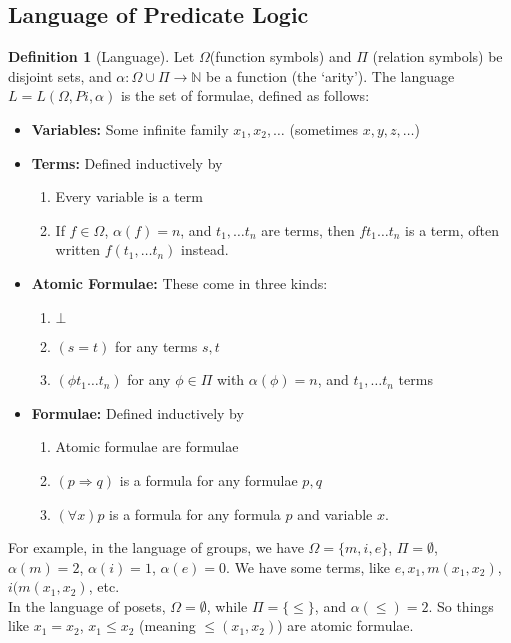 \documentclass{article}
\theoremstyle{definition}
\newtheorem{definition}{Definition}
\numberwithin{definition}{section}
\begin{document}
\subsection{Language of Predicate Logic}
\begin{definition}[Language]
Let $\Omega$(function symbols) and $\Pi$ (relation symbols) be disjoint sets, and $\alpha: \Omega \cup \Pi \to \mathbb{N}$ be a function (the `arity'). The language $L = L(\Omega,Pi,\alpha)$ is the set of formulae, defined as follows: 
\begin{itemize}
\item \textbf{Variables:} Some infinite family $x_{1},x_{2},\ldots$ (sometimes $x,y,z,\ldots$)
\item \textbf{Terms:} Defined inductively by
	\begin{enumerate}[i]
	\item Every variable is a term
	\item If $f \in \Omega$, $\alpha(f) = n$, and $t_{1},\ldots t_{n}$ are terms, then $ft_{1}\ldots t_{n}$ is a term, often written $f(t_{1},\ldots t_{n})$ instead. 
	\end{enumerate}
\item \textbf{Atomic Formulae:} These come in three kinds:
	\begin{enumerate}[i]
	\item $\bot$
	\item $(s=t)$ for any terms $s,t$ 
	\item $(\phi t_{1}\ldots t_{n})$ for any $\phi \in \Pi$ with $\alpha(\phi)=n$, and $t_{1},\ldots t_{n}$ terms
	\end{enumerate}
\item \textbf{Formulae:} Defined inductively by
	\begin{enumerate}[i]
	\item Atomic formulae are formulae
	\item $(p \Rightarrow q)$ is a formula for any formulae $p,q$
	\item $(\forall x) p$ is a formula for any formula $p$ and variable $x$. 
	\end{enumerate}
\end{itemize}
\end{definition}
For example, in the language of groups, we have $\Omega = \{m,i,e\}$, $\Pi = \emptyset$, $\alpha(m) = 2$, $\alpha(i) = 1$, $\alpha(e) = 0$. We have some terms, like $e,x_{1},m(x_{1},x_{2})$, $i(m(x_{1},x_{2})$, etc. \\
In the language of posets, $\Omega = \emptyset$, while $\Pi = \{\le \}$, and $\alpha(\le) = 2$. So things like $x_{1} = x_{2}$, $x_{1} \le x_{2}$ (meaning $\le(x_{1},x_{2})$) are atomic formulae. \\
\end{document}
